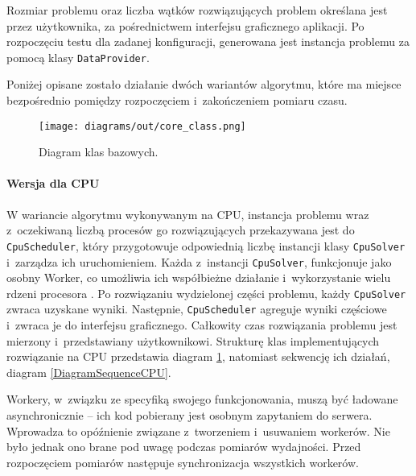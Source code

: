 Rozmiar problemu oraz liczba wątków rozwiązujących problem określana jest przez użytkownika, za pośrednictwem interfejsu graficznego aplikacji. Po rozpoczęciu testu dla zadanej konfiguracji, generowana jest instancja problemu za pomocą klasy \texttt{DataProvider}.

Poniżej opisane zostało działanie dwóch wariantów algorytmu, które ma miejsce bezpośrednio pomiędzy rozpoczęciem i~zakończeniem pomiaru czasu.

\begin{figure}
    \centering
    \texttt{[image: diagrams/out/core\_class.png]}
    \caption{Diagram klas bazowych.}
    \label{DiagramClassCPU}
\end{figure}

\paragraph{Wersja dla CPU}

W wariancie algorytmu wykonywanym na CPU, instancja problemu wraz z~oczekiwaną liczbą procesów go rozwiązujących przekazywana jest do \texttt{CpuScheduler}, który przygotowuje odpowiednią liczbę instancji klasy \texttt{CpuSolver} i~zarządza ich uruchomieniem. Każda z~instancji \texttt{CpuSolver}, funkcjonuje jako osobny Worker, co umożliwia ich współbieżne działanie i~wykorzystanie wielu rdzeni procesora \cite{WebWorker}. Po rozwiązaniu wydzielonej części problemu, każdy \texttt{CpuSolver} zwraca uzyskane wyniki. Następnie, \texttt{CpuScheduler} agreguje wyniki częściowe i~zwraca je do interfejsu graficznego. Całkowity czas rozwiązania problemu jest mierzony i~przedstawiany użytkownikowi.
Strukturę klas implementujących rozwiązanie na CPU przedstawia diagram \ref{DiagramClassCPU}, natomiast sekwencję ich działań, diagram \ref{DiagramSequenceCPU}.

Workery, w~związku ze specyfiką swojego funkcjonowania, muszą być ładowane asynchronicznie -- ich kod pobierany jest osobnym zapytaniem do serwera. Wprowadza to opóźnienie związane z~tworzeniem i~usuwaniem workerów. Nie było jednak ono brane pod uwagę podczas pomiarów wydajności. Przed rozpoczęciem pomiarów następuje synchronizacja wszystkich workerów.


